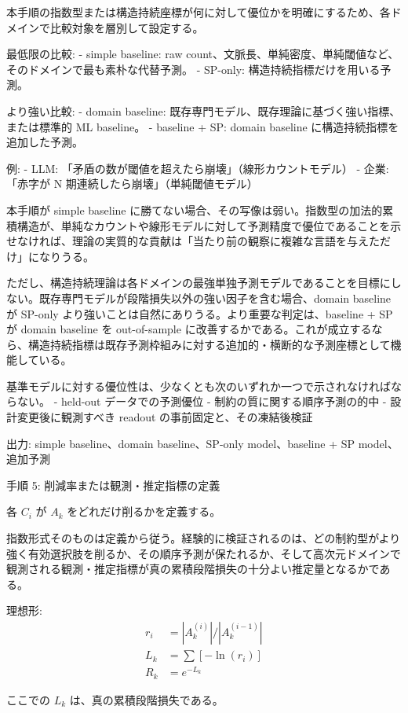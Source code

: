 \documentclass[12pt,a4paper]{article}
\begin{document}
本手順の指数型または構造持続座標が何に対して優位かを明確にするため、各ドメインで比較対象を層別して設定する。

最低限の比較: - simple baseline: raw count、文脈長、単純密度、単純閾値など、そのドメインで最も素朴な代替予測。 - SP-only: 構造持続指標だけを用いる予測。

より強い比較: - domain baseline: 既存専門モデル、既存理論に基づく強い指標、または標準的 ML baseline。 - baseline + SP: domain baseline に構造持続指標を追加した予測。

例: - LLM: 「矛盾の数が閾値を超えたら崩壊」（線形カウントモデル） - 企業: 「赤字が N 期連続したら崩壊」（単純閾値モデル）

本手順が simple baseline に勝てない場合、その写像は弱い。指数型の加法的累積構造が、単純なカウントや線形モデルに対して予測精度で優位であることを示せなければ、理論の実質的な貢献は「当たり前の観察に複雑な言語を与えただけ」になりうる。

ただし、構造持続理論は各ドメインの最強単独予測モデルであることを目標にしない。既存専門モデルが段階損失以外の強い因子を含む場合、domain baseline が SP-only より強いことは自然にありうる。より重要な判定は、baseline + SP が domain baseline を out-of-sample に改善するかである。これが成立するなら、構造持続指標は既存予測枠組みに対する追加的・横断的な予測座標として機能している。

基準モデルに対する優位性は、少なくとも次のいずれか一つで示されなければならない。 - held-out データでの予測優位 - 制約の質に関する順序予測の的中 - 設計変更後に観測すべき readout の事前固定と、その凍結後検証

出力: simple baseline、domain baseline、SP-only model、baseline + SP model、追加予測

手順 5: 削減率または観測・推定指標の定義

各 \(C_{i}\) が \(A_{k}\) をどれだけ削るかを定義する。

指数形式そのものは定義から従う。経験的に検証されるのは、どの制約型がより強く有効選択肢を削るか、その順序予測が保たれるか、そして高次元ドメインで観測される観測・推定指標が真の累積段階損失の十分よい推定量となるかである。

理想形: \[
\begin{aligned}
r_{i} &= |A_{k}^{(i)}| / |A_{k}^{(i-1)}| \\
L_{k} &= \sum[-\ln(r_{i})] \\
R_{k} &= e^{-L_{k}}
\end{aligned}
\]

ここでの \(L_{k}\) は、真の累積段階損失である。
\end{document}
